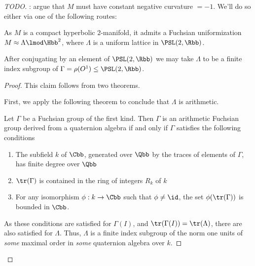 \begin{proof}
	[TODO]: argue that $M$ must have constant negative curvature $=-1$. We'll do so either via one of the following routes:


	As $M$ is a compact hyperbolic $2$-manifold, it admits a Fuchsian uniformization $M \approx \Lambda \lmod \Hbb^2$, where $\Lambda$ is a uniform lattice in $\PSL(2,\Rbb)$.
	\begin{claim}
		After conjugating by an element of $\PSL(2,\Rbb)$ we may take $\Lambda$ to be a finite index subgroup of $\Gamma = \rho(O^1) \leq  \PSL(2,\Rbb)$.
	\end{claim}
	\begin{proof}
		This claim follows from two theorems.

		First, we apply the following theorem to conclude that $\Lambda$ is arithmetic.
		\begin{thm}\label{thm:takeuchi}
			Let $\Gamma$ be a Fuchsian group of the first kind. Then $\Gamma$ is an arithmetic Fuchsian group derived from a quaternion algebra if and only if $\Gamma$ satisfies the following conditions
			\begin{enumerate}
				\item The subfield $k$ of $\Cbb$, generated over $\Qbb$ by the traces of elements of $\Gamma$, has finite degree over $\Qbb$
				\item $\tr(\Gamma)$ is contained in the ring of integers $R_{k}$ of $k$
				\item For any isomorphism $\phi: k \to \Cbb$ such that $\phi \neq \id$, the set $\phi(\tr(\Gamma))$ is bounded in $\Cbb$.
			\end{enumerate}
		\end{thm}
		As these conditions are satisfied for $\Gamma(I)$, and $\tr(\Gamma(I)) = \tr(\Lambda)$, there are also satisfied for $\Lambda$. Thus, $\Lambda$ is a finite index subgroup of the norm one units of \emph{some} maximal order in \emph{some} quaternion algebra over $k$.


\end{proof}
\end{proof}
